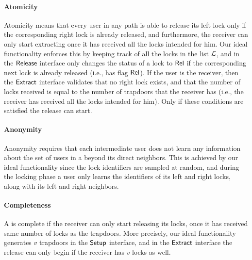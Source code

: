 \paragraph{Atomicity} Atomicity means that every user in any path is able to release its left lock 
only if the corresponding right lock is already released, and furthermore, the receiver can only start extracting once it has received all the locks intended for him. Our ideal functionality enforces this by 
keeping track of all the locks in the list $\mathcal{L}$, and in the $\mathsf{Release}$ interface only changes the 
status of a lock to $\mathsf{Rel}$ if the corresponding next lock is already released (i.e., has flag $\mathsf{Rel}$). 
If the user is the receiver, then the $\mathsf{Extract}$ interface validates that no right lock exists, and that the number of locks received is equal to the number of trapdoors that the receiver has (i.e., the receiver has received all the locks intended for him). Only if these conditions are satisfied the release can start.

\paragraph{Anonymity} Anonymity requires that each intermediate user does not learn any information 
about the set of users in a \sysname beyond its direct neighbors.
This is achieved by our ideal functionality since the lock identifiers are sampled at random, and 
during the locking phase a user only learns the identifiers of its left and right locks, along with 
its left and right neighbors.


\paragraph{Completeness} A \sysname is complete if the receiver can only start releasing its locks,
once it has received same number of locks as the trapdoors. More precisely, our ideal functionality 
generates $v$ trapdoors in the $\mathsf{Setup}$ interface, and in the $\mathsf{Extract}$ interface the release can 
only begin if the receiver has $v$ locks as well.

